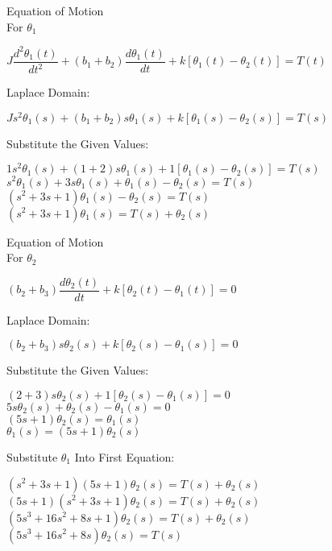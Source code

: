 \documentclass[11pt,letterpaper]{article}
\begin{document}
Equation of Motion\\[12pt]
For $\theta_1$\\
\begin{center}
	$J\dfrac{d^2\theta_1(t)}{dt^2}+(b_1+b_2)\dfrac{d\theta_1(t)}{dt}+k[\theta_1(t)-\theta_2(t)]=T(t)$\\
\end{center}
Laplace Domain:\\
\begin{center}
	$Js^2\theta_1(s)+(b_1+b_2)s\theta_1(s)+k[\theta_1(s)-\theta_2(s)]=T(s)$\\
\end{center}
Substitute the Given Values:\\
\begin{center}
	$1s^2\theta_1(s)+(1+2)s\theta_1(s)+1[\theta_1(s)-\theta_2(s)]=T(s)$\\[12pt]
	$s^2\theta_1(s)+3s\theta_1(s)+\theta_1(s)-\theta_2(s)=T(s)$\\[12pt]
	$(s^2+3s+1)\theta_1(s)-\theta_2(s)=T(s)$\\[12pt]
	$(s^2+3s+1)\theta_1(s)=T(s)+\theta_2(s)$\\
\end{center}
Equation of Motion\\[12pt]
For $\theta_2$\\
\begin{center}
	$(b_2+b_3)\dfrac{d\theta_2(t)}{dt}+k[\theta_2(t)-\theta_1(t)]=0$\\
\end{center}
Laplace Domain:\\
\begin{center}
	$(b_2+b_3)s\theta_2(s)+k[\theta_2(s)-\theta_1(s)]=0$\\
\end{center}
Substitute the Given Values:\\
\begin{center}
	$(2+3)s\theta_2(s)+1[\theta_2(s)-\theta_1(s)]=0$\\[12pt]
	$5s\theta_2(s)+\theta_2(s)-\theta_1(s)=0$\\[12pt]
	$(5s+1)\theta_2(s)=\theta_1(s)$\\[12pt]
	$\theta_1(s)=(5s+1)\theta_2(s)$\\[12pt]
\end{center}
Substitute $\theta_1$ Into First Equation:\\
\begin{center}
	$(s^2+3s+1)(5s+1)\theta_2(s)=T(s)+\theta_2(s)$\\[12pt]
	$(5s+1)(s^2+3s+1)\theta_2(s)=T(s)+\theta_2(s)$\\[12pt]
	$(5s^3+16s^2+8s+1)\theta_2(s)=T(s)+\theta_2(s)$\\[12pt]
	$(5s^3+16s^2+8s)\theta_2(s)=T(s)$\\[12pt]
\end{center}
\end{document}
